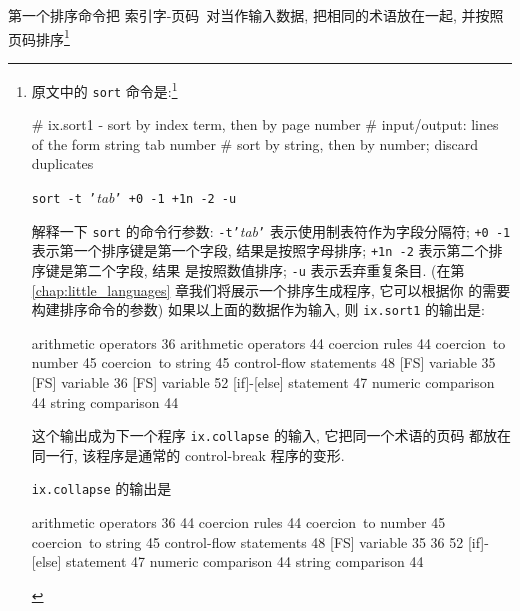 第一个排序命令把 \mbox{索引字}-页码\ 对当作输入数据, 把相同的术语放在一起,
并按照页码排序\footnote{原文中的 \texttt{sort} 命令是:\footnote{
    在Linux中你可以写成 \texttt{sort -t \$'\t' +0 -1 +1n -2 -u}}
\begin{awkcode}
    # ix.sort1 - sort by index term, then by page number
    #     input/output: lines of the form string tab number
    #     sort by string, then by number; discard duplicates
\end{awkcode}
\texttt{sort -t '}\textit{tab}\texttt{' +0 -1 +1n -2 -u} \par 
解释一下 \texttt{sort} 的命令行参数: \texttt{-t'}\textit{tab}\texttt{'}
表示使用制表符作为字段分隔符; \texttt{+0 -1} 表示第一个排序键是第一个字段,
结果是按照字母排序; \texttt{+1n -2} 表示第二个排序键是第二个字段, 结果 
是按照数值排序; \texttt{-u} 表示丢弃重复条目. (在第
\ref{chap:little_languages} 章我们将展示一个排序生成程序, 它可以根据你
的需要构建排序命令的参数) 如果以上面的数据作为输入, 则 \texttt{ix.sort1}
的输出是:
\begin{file}
    arithmetic operators        36
    arithmetic operators        44
    coercion rules      44
    coercion~to number  45
    coercion~to string  45
    control-flow statements     48
    [FS] variable       35
    [FS] variable       36
    [FS] variable       52
    [if]-[else] statement       47
    numeric comparison  44
    string comparison   44
\end{file}

这个输出成为下一个程序 \texttt{ix.collapse} 的输入, 它把同一个术语的页码
都放在同一行, 该程序是通常的 control-break 程序的变形.
\texttt{ix.collapse} 的输出是 
\begin{file}
    arithmetic operators        36 44
    coercion rules      44
    coercion~to number  45
    coercion~to string  45
    control-flow statements     48
    [FS] variable       35 36 52
    [if]-[else] statement       47
    numeric comparison  44
    string comparison   44
\end{file}

}
